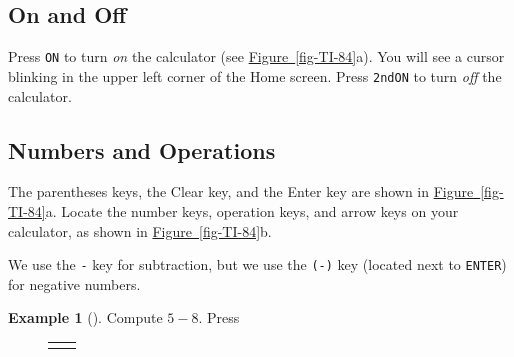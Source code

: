 \documentclass[10pt,]{book}
\theoremstyle{plain}
\theoremstyle{definition}
\theoremstyle{definition}
\newtheorem{example}[theorem]{Example}
\theoremstyle{definition}
\numberwithin{equation}{part}
\newlength{\panelmax}
\begin{document}
\subsection[{On and Off}]{On and Off}\label{subsection-64}
Press \lstinline?ON? to turn \emph{on} the calculator (see \hyperref[fig-TI-84]{Figure~\ref{fig-TI-84}}a). You will see a cursor blinking in the upper left corner of the Home screen. Press \lstinline?2nd?\lstinline?ON? to turn \emph{off} the calculator.%
\typeout{************************************************}
\typeout{************************************************}
\subsection[{Numbers and Operations}]{Numbers and Operations}\label{subsection-65}
The parentheses keys, the Clear key, and the Enter key are shown in \hyperref[fig-TI-84]{Figure~\ref{fig-TI-84}}a. Locate the number keys, operation keys, and arrow keys on your calculator, as shown in \hyperref[fig-TI-84]{Figure~\ref{fig-TI-84}}b.%
\par
We use the \lstinline?-? key for subtraction, but we use the \lstinline?(-)? key (located next to \lstinline?ENTER?) for negative numbers.%
\begin{example}[]\label{example-93}
Compute \(5 - 8\). Press%
{%
\setlength{\panelmax}{0pt}
\newsavebox{\panelboxAHCp}
\newlength{\phAHCp}\setlength{\phAHCp}{\ht\panelboxAHCp+\dp\panelboxAHCp}
\settototalheight{\phAHCp}{\usebox{\panelboxAHCp}}
\setlength{\panelmax}{\maxof{\panelmax}{\phAHCp}}
\newsavebox{\panelboxAHDp}
\newlength{\phAHDp}\setlength{\phAHDp}{\ht\panelboxAHDp+\dp\panelboxAHDp}
\settototalheight{\phAHDp}{\usebox{\panelboxAHDp}}
\setlength{\panelmax}{\maxof{\panelmax}{\phAHDp}}
\leavevmode%
\setlength{\tabcolsep}{0\textwidth}
\begin{figure}
\begin{tabular}{@{}*{2}{c}@{}}
\begin{minipage}[c][\panelmax][t]{0.5\textwidth}\usebox{\panelboxAHCp}\end{minipage}&
\begin{minipage}[c][\panelmax][t]{0.5\textwidth}\usebox{\panelboxAHDp}\end{minipage}\end{tabular}
\end{figure}
}%
\end{example}
\end{document}
